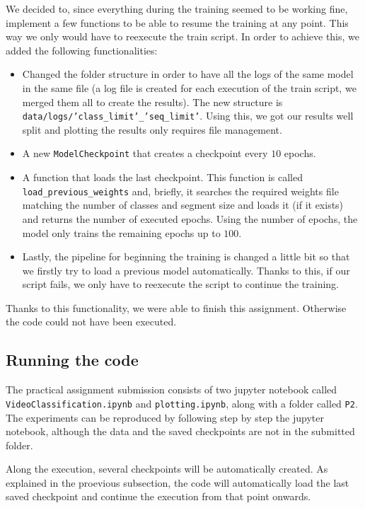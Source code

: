 \documentclass[letterpaper, 10 pt, conference]{ieeeconf}
\begin{document}
We decided to, since everything during the training seemed to be working fine, implement a few functions to be able to resume the training at any point. This way we only would have to reexecute the train script. In order to achieve this, we added the following functionalities:
\begin{itemize}
    \item Changed the folder structure in order to have all the logs of the same model in the same file (a log file is created for each execution of the train script, we merged them all to create the results). The new structure is \texttt{data/logs/'class_limit'_'seq_limit'}. Using this, we got our results well split and plotting the results only requires file management.
    \item A new \texttt{ModelCheckpoint} that creates a checkpoint every \(10\) epochs.
    \item A function that loads the last checkpoint. This function is called \texttt{load_previous_weights} and, briefly, it searches the required weights file matching the number of classes and segment size and loads it (if it exists) and returns the number of executed epochs. Using the number of epochs, the model only trains the remaining epochs up to \(100\).
    \item Lastly, the pipeline for beginning the training is changed a little bit so that we firstly try to load a previous model automatically. Thanks to this, if our script fails, we only have to reexecute the script to continue the training.
\end{itemize}

Thanks to this functionality, we were able to finish this assignment. Otherwise the code could not have been executed.

\subsection{Running the code}
The practical assignment submission consists of two jupyter notebook called \texttt{VideoClassification.ipynb} and \texttt{plotting.ipynb}, along with a folder called \texttt{P2}. The experiments can be reproduced by following step by step the jupyter notebook, although the data and the saved checkpoints are not in the submitted folder.

Along the execution, several checkpoints will be automatically created. As explained in the proevious subsection, the code will automatically load the last saved checkpoint and continue the execution from that point onwards.
\end{document}
